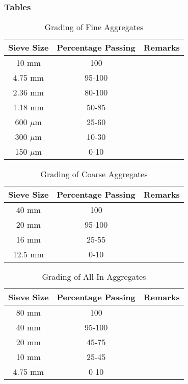 \documentclass[a4paper,11pt]{book}
\begin{document}
\subsubsection*{Tables}
\begin{table}[h!]
    \centering
    \begin{tabular}{|c|c|c|}
        \hline
        Sieve Size & Percentage Passing & Remarks \\
        \hline
        10 mm & 100 & \\
        4.75 mm & 95-100 & \\
        2.36 mm & 80-100 & \\
        1.18 mm & 50-85 & \\
        600 $\mu$m & 25-60 & \\
        300 $\mu$m & 10-30 & \\
        150 $\mu$m & 0-10 & \\
        \hline
    \end{tabular}
    \caption{Grading of Fine Aggregates}
    \label{table:fine_aggregate}
\end{table}

\begin{table}[h!]
    \centering
    \begin{tabular}{|c|c|c|}
        \hline
        Sieve Size & Percentage Passing & Remarks \\
        \hline
        40 mm & 100 & \\
        20 mm & 95-100 & \\
        16 mm & 25-55 & \\
        12.5 mm & 0-10 & \\
        \hline
    \end{tabular}
    \caption{Grading of Coarse Aggregates}
    \label{table:coarse_aggregate}
\end{table}

\begin{table}[h!]
    \centering
    \begin{tabular}{|c|c|c|}
        \hline
        Sieve Size & Percentage Passing & Remarks \\
        \hline
        80 mm & 100 & \\
        40 mm & 95-100 & \\
        20 mm & 45-75 & \\
        10 mm & 25-45 & \\
        4.75 mm & 0-10 & \\
        \hline
    \end{tabular}
    \caption{Grading of All-In Aggregates}
    \label{table:all_in_aggregate}
\end{table}
\end{document}
